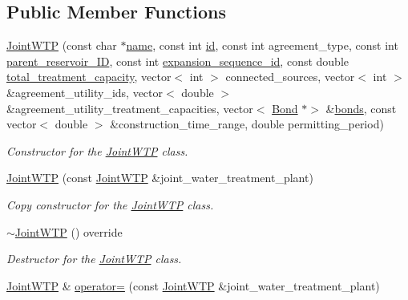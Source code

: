 \subsection*{Public Member Functions}
\begin{DoxyCompactItemize}
\item 
\mbox{\hyperlink{classJointWTP_a1aeeff203eb631ca3bfcf407ab0bbd4f}{Joint\+W\+TP}} (const char $\ast$\mbox{\hyperlink{classWaterSource_a846ea74c5b453d014f594d41fee8c765}{name}}, const int \mbox{\hyperlink{classWaterSource_a6eafe5dfefd317877d1244e8a7c6e742}{id}}, const int agreement\+\_\+type, const int \mbox{\hyperlink{classJointWTP_aa5830cb4d3013a004b7168f4dbf475eb}{parent\+\_\+reservoir\+\_\+\+ID}}, const int \mbox{\hyperlink{classJointWTP_a0e10a7f7ade04d5f3572f185de1b8653}{expansion\+\_\+sequence\+\_\+id}}, const double \mbox{\hyperlink{classWaterSource_a2fdfd5ff7d103e71108cf2a31babaccb}{total\+\_\+treatment\+\_\+capacity}}, vector$<$ int $>$ connected\+\_\+sources, vector$<$ int $>$ \&agreement\+\_\+utility\+\_\+ids, vector$<$ double $>$ \&agreement\+\_\+utility\+\_\+treatment\+\_\+capacities, vector$<$ \mbox{\hyperlink{classBond}{Bond}} $\ast$$>$ \&\mbox{\hyperlink{classWaterSource_a413b094e11bdce62f4d82e5bb9e4706e}{bonds}}, const vector$<$ double $>$ \&construction\+\_\+time\+\_\+range, double permitting\+\_\+period)
\begin{DoxyCompactList}\small\item\em Constructor for the \mbox{\hyperlink{classJointWTP}{Joint\+W\+TP}} class. \end{DoxyCompactList}\item 
\mbox{\hyperlink{classJointWTP_a8b3f000183e4e070bcfc9c20f4be9b54}{Joint\+W\+TP}} (const \mbox{\hyperlink{classJointWTP}{Joint\+W\+TP}} \&joint\+\_\+water\+\_\+treatment\+\_\+plant)
\begin{DoxyCompactList}\small\item\em Copy constructor for the \mbox{\hyperlink{classJointWTP}{Joint\+W\+TP}} class. \end{DoxyCompactList}\item 
\mbox{\hyperlink{classJointWTP_aa4abdd96213a3c9d1b286f75eadcef1f}{$\sim$\+Joint\+W\+TP}} () override
\begin{DoxyCompactList}\small\item\em Destructor for the \mbox{\hyperlink{classJointWTP}{Joint\+W\+TP}} class. \end{DoxyCompactList}\item 
\mbox{\hyperlink{classJointWTP}{Joint\+W\+TP}} \& \mbox{\hyperlink{classJointWTP_a00f348852618d93725c6c83bac49bf00}{operator=}} (const \mbox{\hyperlink{classJointWTP}{Joint\+W\+TP}} \&joint\+\_\+water\+\_\+treatment\+\_\+plant)
$$
\end{DoxyCompactItemize}
